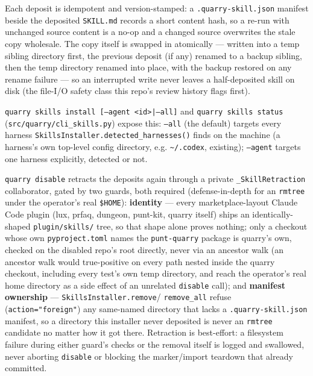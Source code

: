 \documentclass[a4paper,10pt]{article}
\newcommand{\modpath}[1]{\texttt{src/quarry/#1}}
\begin{document}
Each deposit is idempotent and version-stamped: a \texttt{.quarry-skill.json}
manifest beside the deposited \texttt{SKILL.md} records a short content hash,
so a re-run with unchanged source content is a no-op and a changed source
overwrites the stale copy wholesale.  The copy itself is swapped in
atomically --- written into a temp sibling directory first, the previous
deposit (if any) renamed to a backup sibling, then the temp directory renamed
into place, with the backup restored on any rename failure --- so an
interrupted write never leaves a half-deposited skill on disk (the file-I/O
safety class this repo's review history flags first).

\texttt{quarry skills install [--agent <id>|--all]} and \texttt{quarry skills
status} (\modpath{cli\_skills.py}) expose this: \texttt{--all} (the default)
targets every harness \texttt{SkillsInstaller.detected\_harnesses()} finds on
the machine (a harness's own top-level config directory, e.g. \texttt{\textasciitilde{}/.codex},
existing); \texttt{--agent} targets one harness explicitly, detected or not.

\texttt{quarry disable} retracts the deposits again through a private
\texttt{\_SkillRetraction} collaborator, gated by two guards, both required
(defense-in-depth for an \texttt{rmtree} under the operator's real
\texttt{\$HOME}): \textbf{identity} --- every marketplace-layout Claude Code
plugin (lux, prfaq, dungeon, punt-kit, quarry itself) ships an
identically-shaped \texttt{plugin/skills/} tree, so that shape alone proves
nothing; only a checkout whose own \texttt{pyproject.toml} names the
\texttt{punt-quarry} package is quarry's own, checked on the disabled repo's
root directly, never via an ancestor walk (an ancestor walk would
true-positive on every path nested inside the quarry checkout, including
every test's own temp directory, and reach the operator's real home
directory as a side effect of an unrelated \texttt{disable} call); and
\textbf{manifest ownership} --- \texttt{SkillsInstaller.remove}/
\texttt{remove\_all} refuse (\texttt{action="foreign"}) any same-named
directory that lacks a \texttt{.quarry-skill.json} manifest, so a directory
this installer never deposited is never an \texttt{rmtree} candidate no
matter how it got there. Retraction is best-effort: a filesystem failure
during either guard's checks or the removal itself is logged and swallowed,
never aborting \texttt{disable} or blocking the marker/import teardown that
already committed.

\end{document}
